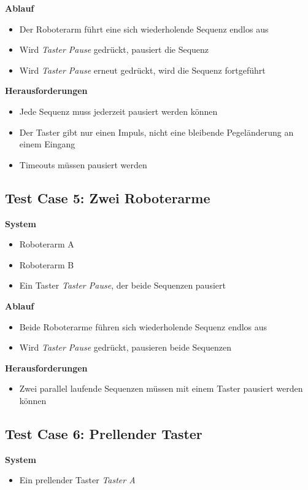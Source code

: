 \textbf{Ablauf}
\begin{itemize}
\item Der Roboterarm führt eine sich wiederholende Sequenz endlos aus
\item Wird \textit{Taster Pause} gedrückt, pausiert die Sequenz
\item Wird \textit{Taster Pause} erneut gedrückt, wird die Sequenz fortgeführt
\end{itemize}

\textbf{Herausforderungen}
\begin{itemize}
\item Jede Sequenz muss jederzeit pausiert werden können
\item Der Taster gibt nur einen Impuls, nicht eine bleibende Pegeländerung an einem Eingang
\item Timeouts müssen pausiert werden
\end{itemize}


\subsection{Test Case 5: Zwei Roboterarme}
\textbf{System}
\begin{itemize}
\item Roboterarm A
\item Roboterarm B
\item Ein Taster \textit{Taster Pause}, der beide Sequenzen pausiert
\end{itemize}

\textbf{Ablauf}
\begin{itemize}
\item Beide Roboterarme führen sich wiederholende Sequenz endlos aus
\item Wird \textit{Taster Pause} gedrückt, pausieren beide Sequenzen
\end{itemize}

\textbf{Herausforderungen}
\begin{itemize}
\item Zwei parallel laufende Sequenzen müssen mit einem Taster pausiert werden können
\end{itemize}


\subsection{Test Case 6: Prellender Taster}
\textbf{System}
\begin{itemize}
\item Ein prellender Taster \textit{Taster A}
\end{itemize}


